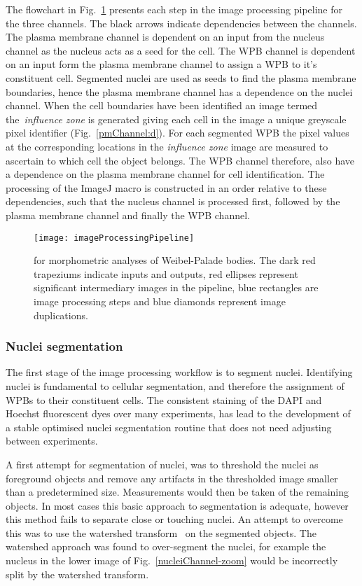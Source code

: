 The flowchart in Fig.~\ref{imageProcessingPipeline:WPB} presents each step in the image processing pipeline for the three channels. The black arrows indicate dependencies between the channels. The plasma membrane channel is dependent on an input from the nucleus channel as the nucleus acts as a seed for the cell. The WPB channel is dependent on an input form the plasma membrane channel to assign a WPB to it's constituent cell. Segmented nuclei are used as seeds to find the plasma membrane boundaries, hence the plasma membrane channel has a dependence on the nuclei channel. When the cell boundaries have been identified an image termed the~\emph{influence zone} is generated giving each cell in the image a unique greyscale pixel identifier (Fig.~\ref{pmChannel:d}). For each segmented WPB the pixel values at the corresponding locations in the \emph{influence zone} image are measured to ascertain to which cell the object belongs. The WPB channel therefore, also have a dependence on the plasma membrane channel for cell identification. The processing of the ImageJ macro is constructed in an order relative to these dependencies, such that the nucleus channel is processed first, followed by the plasma membrane channel and finally the WPB channel.

\begin{figure}
	\centering
	\texttt{[image: imageProcessingPipeline]}
	\caption[Image processing pipeline WPB]{for morphometric analyses of Weibel-Palade bodies. The dark red trapeziums indicate inputs and outputs, red ellipses represent significant intermediary images in the pipeline, blue rectangles are image processing steps and blue diamonds represent image duplications.}
	\label{imageProcessingPipeline:WPB}
\end{figure}

\subsubsection{Nuclei segmentation}
The first stage of the image processing workflow is to segment nuclei. Identifying nuclei is fundamental to cellular segmentation, and therefore the assignment of WPBs to their constituent cells. The consistent staining of the DAPI and Hoechst fluorescent dyes over many experiments, has lead to the development of a stable optimised nuclei segmentation routine that does not need adjusting between experiments.

A first attempt for segmentation of nuclei, was to threshold the nuclei as foreground objects and remove any artifacts in the thresholded image smaller than a predetermined size. Measurements would then be taken of the remaining objects. In most cases this basic approach to segmentation is adequate, however this method fails to separate close or touching nuclei. An attempt to overcome this was to use the watershed transform~\cite{Vincent1991} on the segmented objects. The watershed approach was found to over-segment the nuclei, for example the nucleus in the lower image of Fig.~\ref{nucleiChannel-zoom} would be incorrectly split by the watershed transform.

